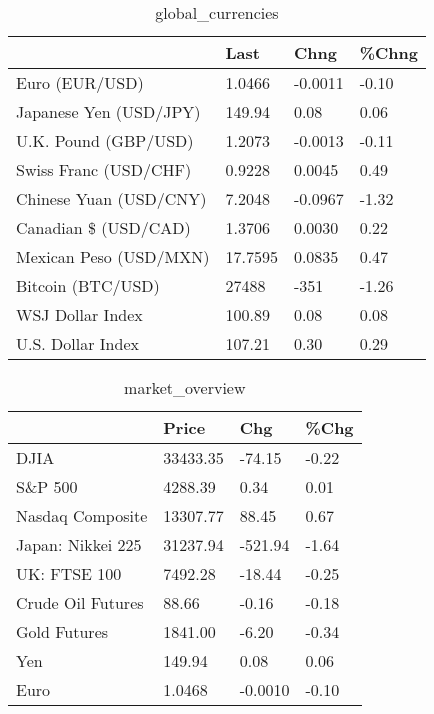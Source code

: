 \documentclass{article}%
\begin{document}
%


\begin{table}[htbp]%
\caption{global\_currencies}%
\centering%
\begin{adjustbox}{width=1\textwidth}%
\begin{tabular}{llll}
\toprule
                       &    Last &    Chng & \%Chng \\
\midrule
        Euro (EUR/USD) &  1.0466 & -0.0011 & -0.10 \\
Japanese Yen (USD/JPY) &  149.94 &    0.08 &  0.06 \\
  U.K. Pound (GBP/USD) &  1.2073 & -0.0013 & -0.11 \\
 Swiss Franc (USD/CHF) &  0.9228 &  0.0045 &  0.49 \\
Chinese Yuan (USD/CNY) &  7.2048 & -0.0967 & -1.32 \\
  Canadian \$ (USD/CAD) &  1.3706 &  0.0030 &  0.22 \\
Mexican Peso (USD/MXN) & 17.7595 &  0.0835 &  0.47 \\
     Bitcoin (BTC/USD) &   27488 &    -351 & -1.26 \\
      WSJ Dollar Index &  100.89 &    0.08 &  0.08 \\
     U.S. Dollar Index &  107.21 &    0.30 &  0.29 \\
\bottomrule
\end{tabular}
%
\end{adjustbox}%
\end{table}

%


\begin{table}[htbp]%
\caption{market\_overview}%
\centering%
\begin{adjustbox}{width=1\textwidth}%
\begin{tabular}{llll}
\toprule
                  &    Price &     Chg &  \%Chg \\
\midrule
             DJIA & 33433.35 &  -74.15 & -0.22 \\
          S\&P 500 &  4288.39 &    0.34 &  0.01 \\
 Nasdaq Composite & 13307.77 &   88.45 &  0.67 \\
Japan: Nikkei 225 & 31237.94 & -521.94 & -1.64 \\
     UK: FTSE 100 &  7492.28 &  -18.44 & -0.25 \\
Crude Oil Futures &    88.66 &   -0.16 & -0.18 \\
     Gold Futures &  1841.00 &   -6.20 & -0.34 \\
              Yen &   149.94 &    0.08 &  0.06 \\
             Euro &   1.0468 & -0.0010 & -0.10 \\
\bottomrule
\end{tabular}
%
\end{adjustbox}%
\end{table}

%
\end{document}
